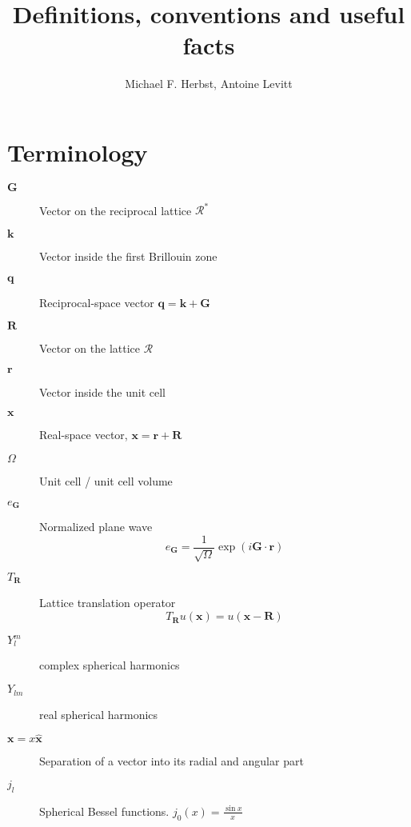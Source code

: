 \documentclass[a4paper]{amsart}
\newcommand{\I}{i}
\newcommand{\Op}[1]{#1}
\renewcommand{\vec}[1]{{\mathbf{#1}}}
\newcommand*{\uvec}[1]{\ensuremath{\hat{{\boldsymbol{#1}}}}}	%
\begin{document}
\title{Definitions, conventions and useful facts}
\author{Michael F. Herbst, Antoine Levitt}
\maketitle

\section{Terminology}
\begin{description}
\item[$\vec{G}$] Vector on the reciprocal lattice $\mathcal{R}^\ast$
\item[$\vec{k}$] Vector inside the first Brillouin zone
\item[$\vec{q}$] Reciprocal-space vector $\vec{q} = \vec{k} + \vec{G}$
\item[$\vec{R}$] Vector on the lattice $\mathcal{R}$
\item[$\vec{r}$] Vector inside the unit cell
\item[$\vec{x}$] Real-space vector, $\vec{x} = \vec{r} + \vec{R}$
\item[$\Omega$] Unit cell / unit cell volume
\item[$e_{\vec{G}}$] Normalized plane wave
  \[ e_{\vec{G}} = \frac1{\sqrt{\Omega}} \exp(\I \vec{G} \cdot \vec{r})\]
\item[$\Op{T}_{\vec{R}}$] Lattice translation operator
  \[ \Op{T}_{\vec{R}} u(\vec{x}) = u(\vec{x} -
    \vec{R}) \]
\item[$Y_l^m$] complex spherical harmonics
\item[$Y_{lm}$] real spherical harmonics
\item[$\vec x = x \uvec x$] Separation of a vector into its radial and
  angular part
\item[$j_{l}$] Spherical Bessel functions. $j_{0}(x) = \frac{\sin x}{x}$
\end{description}
\end{document}
